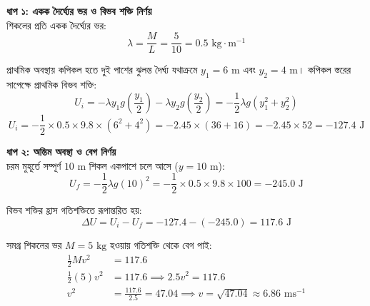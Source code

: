 \documentclass[12pt, a4paper]{article}
\begin{document}
\begin{tcolorbox}[solutionbox={সমাধান (Solution)}]
    \noindent
    \textbf{ধাপ ১: একক দৈর্ঘ্যের ভর ও বিভব শক্তি নির্ণয়} \\
    শিকলের প্রতি একক দৈর্ঘ্যের ভর:
    \[ \lambda = \frac{M}{L} = \frac{5}{10} = 0.5\text{ kg}\cdot\text{m}^{-1} \]
    
    প্রাথমিক অবস্থায় কপিকল হতে দুই পাশের ঝুলন্ত দৈর্ঘ্য যথাক্রমে $y_1 = 6\text{ m}$ এবং $y_2 = 4\text{ m}$। কপিকল স্তরের সাপেক্ষে প্রাথমিক বিভব শক্তি:
    \[ U_i = -\lambda y_1 g \left(\frac{y_1}{2}\right) - \lambda y_2 g \left(\frac{y_2}{2}\right) = -\frac{1}{2} \lambda g (y_1^2 + y_2^2) \]
    \[ U_i = -\frac{1}{2} \times 0.5 \times 9.8 \times (6^2 + 4^2) = -2.45 \times (36 + 16) = -2.45 \times 52 = -127.4\text{ J} \]
    
    \vspace{0.5em}
    \noindent\textbf{ধাপ ২: অন্তিম অবস্থা ও বেগ নির্ণয়} \\
    চরম মুহূর্তে সম্পূর্ণ $10\text{ m}$ শিকল একপাশে চলে আসে ($y = 10\text{ m}$):
    \[ U_f = -\frac{1}{2} \lambda g (10)^2 = -\frac{1}{2} \times 0.5 \times 9.8 \times 100 = -245.0\text{ J} \]
    
    বিভব শক্তির হ্রাস গতিশক্তিতে রূপান্তরিত হয়:
    \[ \Delta U = U_i - U_f = -127.4 - (-245.0) = 117.6\text{ J} \]
    
    সমগ্র শিকলের ভর $M = 5\text{ kg}$ হওয়ায় গতিশক্তি থেকে বেগ পাই:
    \begin{align*}
        \frac{1}{2} M v^2 &= 117.6 \\
        \frac{1}{2} (5) v^2 &= 117.6 \implies 2.5 v^2 = 117.6 \\
        v^2 &= \frac{117.6}{2.5} = 47.04 \implies v = \sqrt{47.04} \approx \mathbf{6.86}\text{ ms}^{-1}
    \end{align*}
\end{tcolorbox}

\newpage
\end{document}
